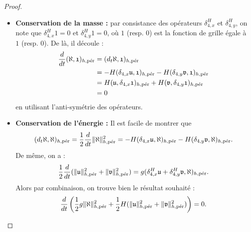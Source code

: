\begin{proof}
\begin{itemize}
\item \textbf{Conservation de la masse :}
par consistance des opérateurs $\delta_{4,x}^H$ et $\delta_{4,y}^H$, on note que $\delta_{4,x}^H \mathfrak{1} = \mathfrak{0}$ et $\delta_{4,y}^H \mathfrak{1} = \mathfrak{0}$, où $\mathfrak{1}$ (resp. $\mathfrak{0}$) est la fonction de grille égale à $1$ (resp. $0$). De là, il découle :
\begin{align*}
\dfrac{d}{dt} (\etafrak, \mathfrak{1})_{h,\per} & = ( d_t \etafrak, \mathfrak{1} )_{h,\per} \\
	& = - H (\delta_{4,x} \mathfrak{u}, \mathfrak{1})_{h,\per} - H (\delta_{4,y} \mathfrak{v}, \mathfrak{1})_{h,\per} \\
	& = H (\mathfrak{u}, \delta_{4,x} \mathfrak{1})_{h,\per} + H (\mathfrak{v}, \delta_{4,y} \mathfrak{1})_{h,\per} \\
	& = 0
\end{align*}
en utilisant l'anti-symétrie des opérateurs.

\item \textbf{Conservation de l'énergie :}
Il est facile de montrer que 
\begin{equation}
(d_t \etafrak, \etafrak)_{h,\per} = \dfrac{1}{2} \dfrac{d}{dt} \| \etafrak \|^2_{h,\per} = - H (\delta_{4,x} \mathfrak{u}, \etafrak)_{h,\per} - H (\delta_{4,y} \mathfrak{v}, \etafrak)_{h,\per}.
\end{equation}
De même, on a :
\begin{equation}
\dfrac{1}{2} \dfrac{d}{dt} (\| \mathfrak{u} \|_{h,\per}^2 + \| \mathfrak{v} \|_{h,\per}^2) = g (\delta_{4,x}^H \mathfrak{u}+\delta_{4,y}^H \mathfrak{v}, \etafrak)_{h,\per}.
\end{equation}
Alors par combinaison, on trouve bien le résultat souhaité :
\begin{equation}
\dfrac{d}{dt} \left( \dfrac{1}{2} g \| \etafrak \|_{h,\per}^2 + \dfrac{1}{2} H ( \| \mathfrak{u} \|_{h,\per}^2 +  \| \mathfrak{v} \|_{h,\per}^2) \right) = 0.
\end{equation}
\end{itemize}
\end{proof}

